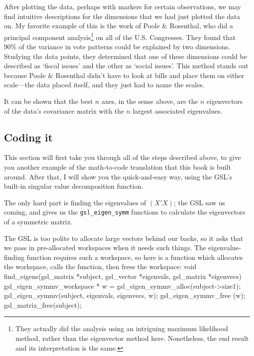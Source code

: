 After plotting the data, perhaps with markers for certain observations,
we may find intuitive descriptions for the dimensions that we had just plotted the
data on. My favorite example of this is the work of Poole \& Rosenthal,
who did a principal component analysis\footnote{They actually did
the analysis using an intriguing maximum likelihood method, rather
than the eigenvector method here. Nonetheless, the end result and its
interpretation is the same.} on all of the U.S. Congresses. They found
that 90\% of the variance in vote patterns could be explained by two dimensions.
Studying the data points, they determined that one of these dimensions could be
described as `fiscal issues' and the other as `social issues'. This method stands
out because Poole \& Rosenthal didn't have to look at bills and place them on
either scale---the data placed itself, and they just had to name the scales.


It can be shown that the best $n$ axes, in the sense above, are the
$n$ eigenvectors of the data's covariance matrix with the $n$ largest
associated eigenvalues.

\subsection{Coding it}
This section will first take you through all of the steps described above, to give you another example
of the math-to-code translation that this book is built around. After that, I will show you the quick-and-easy
way, using the GSL's built-in singular value decomposition function.

The only hard part is finding the eigenvalues of
$(X'X)$; the GSL saw us coming, and gives us the {\tt gsl\_eigen\_symm} functions
to calculate the eigenvectors of a symmetric matrix.

The GSL is too polite to allocate large vectors behind our backs, so
it asks that we pass in pre-allocated workspaces when it needs such
things. The eigenvalue-finding function requires such a workspace, so
here is a function which allocates the workspace, calls the function,
then frees the workspace:
void find_eigens(gsl_matrix *subject, gsl_vector *eigenvals, 
                            gsl_matrix *eigenvecs){
   gsl_eigen_symmv_workspace * w 
                        = gsl_eigen_symmv_alloc(subject->size1);
   gsl_eigen_symmv(subject, eigenvals, eigenvecs, w);
   gsl_eigen_symmv_free (w);
   gsl_matrix_free(subject);
}

